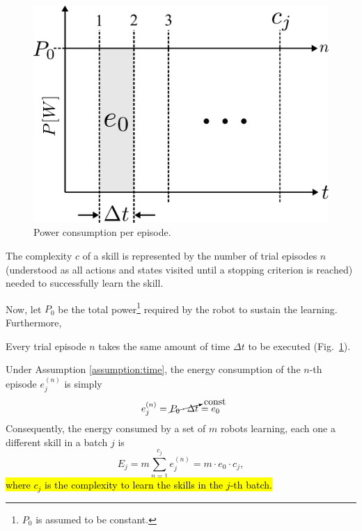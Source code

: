 \begin{figure}[!ht]
	\centering
	\includegraphics[width=0.9\columnwidth]{fig/power_per_episode.pdf}
	\caption{Power consumption per episode.}
	\label{fig:power_per_episode}
\end{figure}
\begin{tcolorbox}
\begin{definition}\label{definition:complexity} The complexity $c$ of a skill is represented by the number of trial episodes $n$ (understood as all actions and states visited until a stopping criterion is reached) needed to successfully learn the skill. 
\end{definition}
\end{tcolorbox}
Now, let $P_0$ be the total power\footnote{$P_0$ is assumed to be constant.} required by the robot to sustain the learning. Furthermore,
\begin{tcolorbox}
\begin{assumption}\label{assumption:time} Every trial episode $n$ takes the same amount of time $\Delta t$ to be executed (Fig.~\ref{fig:power_per_episode}).
\end{assumption}
\end{tcolorbox}
Under Assumption \ref{assumption:time}, the energy consumption of the $n$-th episode $e^{(n)}_j$ is simply
\begin{equation}\label{eq:energy_per_episode}
    e^{(n)}_j = \cancelto{\text{const}}{P_0\cdot \Delta t} = e_0
\end{equation}
Consequently, the energy consumed by a set of $m$ robots learning, each one a different skill in a batch $j$ is
\begin{equation}\label{eq:energy_per_task}
    E_j =m \sum_{n=1}^{c_j} e^{(n)}_j = m \cdot e_0 \cdot c_j,
\end{equation}
\hl{where $c_j$ is the complexity to learn the skills in the $j$-th batch.}

